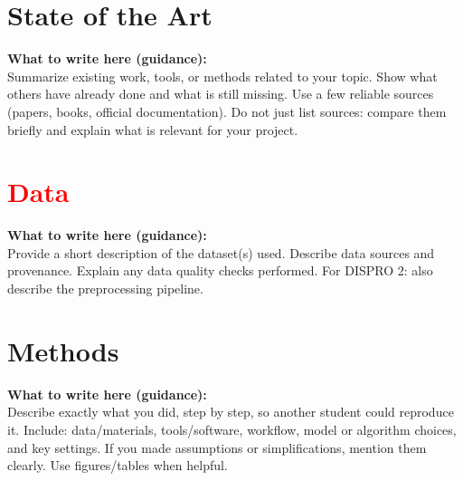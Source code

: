 \documentclass[11pt,a4paper]{article}
\newcommand{\expectation}[1]{%
\colorbox{boxGray}{%
\parbox{\dimexpr\linewidth-2\fboxsep\relax}{%
\textbf{What to write here (guidance):}\\[-0.2em]
\textcolor{textGray}{#1}
}}}
\begin{document}
\vspace{0.5em}

\section{State of the Art}
\expectation{
Summarize existing work, tools, or methods related to your topic.
Show what others have already done and what is still missing.
Use a few reliable sources (papers, books, official documentation).
Do not just list sources: compare them briefly and explain what is relevant for your project.
}

\vspace{0.5em}
\section{\textcolor{red}{Data}}

{\color{red}

\expectation{
Provide a short description of the dataset(s) used.
Describe data sources and provenance.
Explain any data quality checks performed.
For DISPRO 2: also describe the preprocessing pipeline.
}

\vspace{0.5em}

}

\section{Methods}
\expectation{
Describe exactly what you did, step by step, so another student could reproduce it.
Include: data/materials, tools/software, workflow, model or algorithm choices, and key settings.
If you made assumptions or simplifications, mention them clearly.
Use figures/tables when helpful.
}

\vspace{0.5em}
\end{document}
